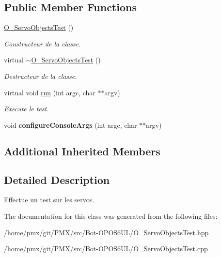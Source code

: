 \subsection*{Public Member Functions}
\begin{DoxyCompactItemize}
\item 
\mbox{\label{classO__ServoObjectsTest_acffee16041c41355d9f013dd2726d9e5}} 
\hyperlink{classO__ServoObjectsTest_acffee16041c41355d9f013dd2726d9e5}{O\+\_\+\+Servo\+Objects\+Test} ()
\begin{DoxyCompactList}\small\item\em Constructeur de la classe. \end{DoxyCompactList}\item 
\mbox{\label{classO__ServoObjectsTest_a0dfc943988d0ad1bf94c36f2425894fb}} 
virtual \hyperlink{classO__ServoObjectsTest_a0dfc943988d0ad1bf94c36f2425894fb}{$\sim$\+O\+\_\+\+Servo\+Objects\+Test} ()
\begin{DoxyCompactList}\small\item\em Destructeur de la classe. \end{DoxyCompactList}\item 
\mbox{\label{classO__ServoObjectsTest_aabfa9ba518070128940062ed11028ca7}} 
virtual void \hyperlink{classO__ServoObjectsTest_aabfa9ba518070128940062ed11028ca7}{run} (int argc, char $\ast$$\ast$argv)
\begin{DoxyCompactList}\small\item\em Execute le test. \end{DoxyCompactList}\item 
\mbox{\label{classO__ServoObjectsTest_a88eeea465c68f251d5e892e835f6b3eb}} 
void {\bfseries configure\+Console\+Args} (int argc, char $\ast$$\ast$argv)
\end{DoxyCompactItemize}
\subsection*{Additional Inherited Members}


\subsection{Detailed Description}
Effectue un test sur les servos. 

The documentation for this class was generated from the following files\+:\begin{DoxyCompactItemize}
\item 
/home/pmx/git/\+P\+M\+X/src/\+Bot-\/\+O\+P\+O\+S6\+U\+L/O\+\_\+\+Servo\+Objects\+Test.\+hpp\item 
/home/pmx/git/\+P\+M\+X/src/\+Bot-\/\+O\+P\+O\+S6\+U\+L/O\+\_\+\+Servo\+Objects\+Test.\+cpp\end{DoxyCompactItemize}
